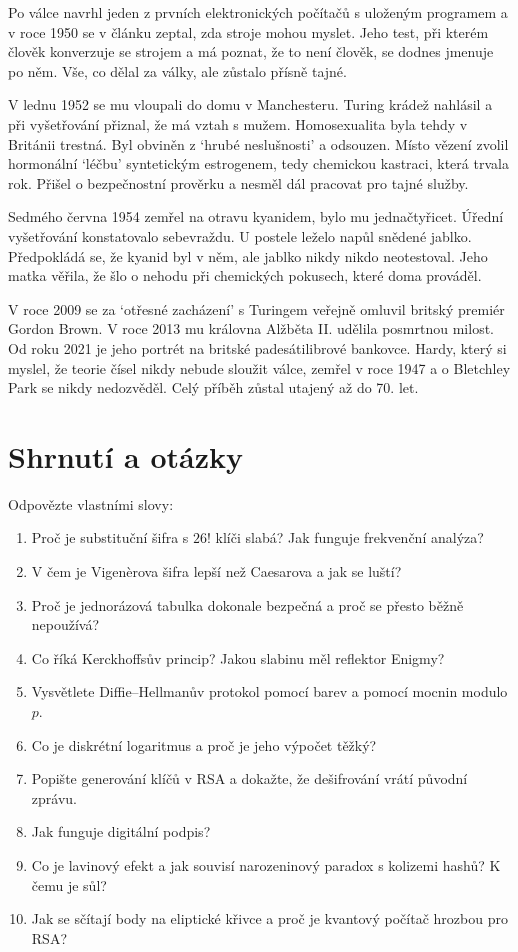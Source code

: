 Po válce navrhl jeden z prvních elektronických počítačů s uloženým programem a v roce 1950 se v článku zeptal, zda stroje mohou myslet. Jeho test, při kterém člověk konverzuje se strojem a má poznat, že to není člověk, se dodnes jmenuje po něm. Vše, co dělal za války, ale zůstalo přísně tajné.

V lednu 1952 se mu vloupali do domu v Manchesteru. Turing krádež nahlásil a při vyšetřování přiznal, že má vztah s mužem. Homosexualita byla tehdy v Británii trestná. Byl obviněn z `hrubé neslušnosti' a odsouzen. Místo vězení zvolil hormonální `léčbu' syntetickým estrogenem, tedy chemickou kastraci, která trvala rok. Přišel o bezpečnostní prověrku a nesměl dál pracovat pro tajné služby.

Sedmého června 1954 zemřel na otravu kyanidem, bylo mu jednačtyřicet. Úřední vyšetřování konstatovalo sebevraždu. U postele leželo napůl snědené jablko. Předpokládá se, že kyanid byl v něm, ale jablko nikdy nikdo neotestoval. Jeho matka věřila, že šlo o nehodu při chemických pokusech, které doma prováděl.

V roce 2009 se za `otřesné zacházení' s Turingem veřejně omluvil britský premiér Gordon Brown. V roce 2013 mu královna Alžběta II. udělila posmrtnou milost. Od roku 2021 je jeho portrét na britské padesátilibrové bankovce. Hardy, který si myslel, že teorie čísel nikdy nebude sloužit válce, zemřel v roce 1947 a o Bletchley Park se nikdy nedozvěděl. Celý příběh zůstal utajený až do 70. let.

\section{Shrnutí a otázky}

\begin{problem}
  Odpovězte vlastními slovy:
  \begin{enumerate}
    \item Proč je substituční šifra s $26!$ klíči slabá? Jak funguje frekvenční analýza?
    \item V čem je Vigenèrova šifra lepší než Caesarova a jak se luští?
    \item Proč je jednorázová tabulka dokonale bezpečná a proč se přesto běžně nepoužívá?
    \item Co říká Kerckhoffsův princip? Jakou slabinu měl reflektor Enigmy?
    \item Vysvětlete Diffie--Hellmanův protokol pomocí barev a pomocí mocnin modulo $p$.
    \item Co je diskrétní logaritmus a proč je jeho výpočet těžký?
    \item Popište generování klíčů v RSA a dokažte, že dešifrování vrátí původní zprávu.
    \item Jak funguje digitální podpis?
    \item Co je lavinový efekt a jak souvisí narozeninový paradox s kolizemi hashů? K čemu je sůl?
    \item Jak se sčítají body na eliptické křivce a proč je kvantový počítač hrozbou pro RSA?
  \end{enumerate}
\end{problem}
